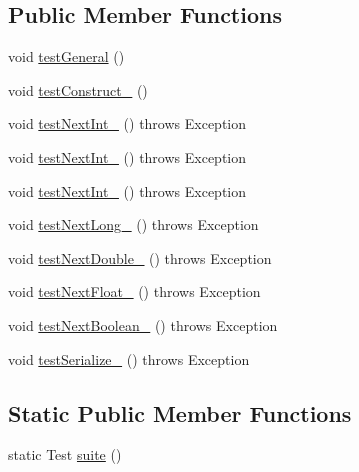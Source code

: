 \subsection*{Public Member Functions}
\begin{DoxyCompactItemize}
\item 
void \hyperlink{classorg_1_1jgap_1_1impl_1_1_seeded_random_generator_test_ab2c494c78cb193c3b324141a4fe7b132}{test\-General} ()
\item 
void \hyperlink{classorg_1_1jgap_1_1impl_1_1_seeded_random_generator_test_ab54b4a6b36e19967a0e3e40ed778481f}{test\-Construct\-\_} ()
\item 
void \hyperlink{classorg_1_1jgap_1_1impl_1_1_seeded_random_generator_test_a2b7dbfcf5cf4db04d4e290d9476148c7}{test\-Next\-Int\-\_} ()  throws Exception 
\item 
void \hyperlink{classorg_1_1jgap_1_1impl_1_1_seeded_random_generator_test_a4c0494fc8b9c27bcc7551b832d3f78de}{test\-Next\-Int\-\_} ()  throws Exception 
\item 
void \hyperlink{classorg_1_1jgap_1_1impl_1_1_seeded_random_generator_test_a52c8879b5598b0c5387a8c4bf10d04e1}{test\-Next\-Int\-\_} ()  throws Exception 
\item 
void \hyperlink{classorg_1_1jgap_1_1impl_1_1_seeded_random_generator_test_a26af4186e4c8ff76c3aad63033cf9498}{test\-Next\-Long\-\_} ()  throws Exception 
\item 
void \hyperlink{classorg_1_1jgap_1_1impl_1_1_seeded_random_generator_test_a4d6a715f6e58b623d423dafb8e0fe278}{test\-Next\-Double\-\_} ()  throws Exception 
\item 
void \hyperlink{classorg_1_1jgap_1_1impl_1_1_seeded_random_generator_test_a466846a2edd6a65ac02a8f3c322c9789}{test\-Next\-Float\-\_} ()  throws Exception 
\item 
void \hyperlink{classorg_1_1jgap_1_1impl_1_1_seeded_random_generator_test_a69dd0c6917773d93c771ba80f18da00a}{test\-Next\-Boolean\-\_} ()  throws Exception 
\item 
void \hyperlink{classorg_1_1jgap_1_1impl_1_1_seeded_random_generator_test_a25f378581cb61c7eca80c109fafe55d5}{test\-Serialize\-\_} ()  throws Exception 
\end{DoxyCompactItemize}
\subsection*{Static Public Member Functions}
\begin{DoxyCompactItemize}
\item 
static Test \hyperlink{classorg_1_1jgap_1_1impl_1_1_seeded_random_generator_test_a01464dda2d82bd4386e79bde2dfd3cab}{suite} ()
\end{DoxyCompactItemize}
